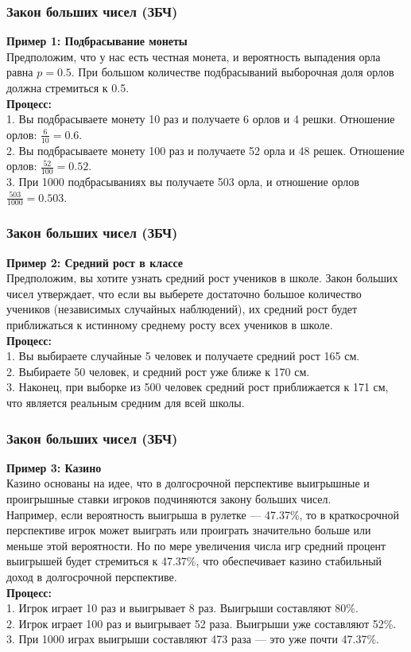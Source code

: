 \documentclass[aspectratio=169]{beamer}
\begin{document}
\begin{frame}
\frametitle{Закон больших чисел (ЗБЧ)}
{\bf Пример 1: Подбрасывание монеты}\\
Предположим, что у нас есть честная монета, и вероятность выпадения орла равна \( p = 0.5 \). При большом количестве подбрасываний выборочная доля орлов должна стремиться к 0.5.
\newline\\
{\bf Процесс:}\\
1. Вы подбрасываете монету 10 раз и получаете 6 орлов и 4 решки. Отношение орлов: \( \frac{6}{10} = 0.6 \).\\
2. Вы подбрасываете монету 100 раз и получаете 52 орла и 48 решек. Отношение орлов: \( \frac{52}{100} = 0.52 \).\\
3. При 1000 подбрасываниях вы получаете 503 орла, и отношение орлов \( \frac{503}{1000} = 0.503 \).
\end{frame}

\begin{frame}
\frametitle{Закон больших чисел (ЗБЧ)}
{\bf Пример 2: Средний рост в классе}\\
Предположим, вы хотите узнать средний рост учеников в школе. Закон больших чисел утверждает, что если вы выберете достаточно большое количество учеников (независимых случайных наблюдений), их средний рост будет приближаться к истинному среднему росту всех учеников в школе.
\newline\\
{\bf Процесс:}\\
1. Вы выбираете случайные 5 человек и получаете средний рост 165 см.\\
2. Выбираете 50 человек, и средний рост уже ближе к 170 см.\\
3. Наконец, при выборке из 500 человек средний рост приближается к 171 см, что является реальным средним для всей школы.
\end{frame}

\begin{frame}
\frametitle{Закон больших чисел (ЗБЧ)}
{\bf Пример 3: Казино}\\
Казино основаны на идее, что в долгосрочной перспективе выигрышные и проигрышные ставки игроков подчиняются закону больших чисел.\\
Например, если вероятность выигрыша в рулетке — 47.37\%, то в краткосрочной перспективе игрок может выиграть или проиграть значительно больше или меньше этой вероятности. Но по мере увеличения числа игр средний процент выигрышей будет стремиться к 47.37\%, что обеспечивает казино стабильный доход в долгосрочной перспективе.
\newline\\
{\bf Процесс:}\\
1. Игрок играет 10 раз и выигрывает 8 раз. Выигрыши составляют 80\%.\\
2. Игрок играет 100 раз и выигрывает 52 раза. Выигрыши уже составляют 52\%.\\
3. При 1000 играх выигрыши составляют 473 раза — это уже почти 47.37\%.
\end{frame}
\end{document}
